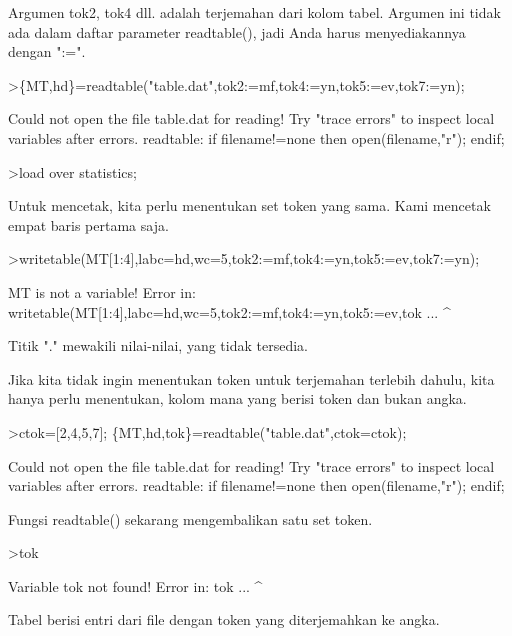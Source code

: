 \documentclass{article}
\begin{document}
\begin{eulernotebook}
\begin{eulercomment}
\begin{eulercomment}
\begin{eulercomment}
Argumen tok2, tok4 dll. adalah terjemahan dari kolom tabel. Argumen
ini tidak ada dalam daftar parameter readtable(), jadi Anda harus
menyediakannya dengan ":=".
\end{eulercomment}
\begin{eulerprompt}
>\{MT,hd\}=readtable("table.dat",tok2:=mf,tok4:=yn,tok5:=ev,tok7:=yn);
\end{eulerprompt}
\begin{euleroutput}
  Could not open the file
  table.dat
  for reading!
  Try "trace errors" to inspect local variables after errors.
  readtable:
      if filename!=none then open(filename,"r"); endif;
\end{euleroutput}
\begin{eulerprompt}
>load over statistics;
\end{eulerprompt}
\begin{eulercomment}
Untuk mencetak, kita perlu menentukan set token yang sama. Kami
mencetak empat baris pertama saja.
\end{eulercomment}
\begin{eulerprompt}
>writetable(MT[1:4],labc=hd,wc=5,tok2:=mf,tok4:=yn,tok5:=ev,tok7:=yn);
\end{eulerprompt}
\begin{euleroutput}
  MT is not a variable!
  Error in:
  writetable(MT[1:4],labc=hd,wc=5,tok2:=mf,tok4:=yn,tok5:=ev,tok ...
                    ^
\end{euleroutput}
\begin{eulercomment}
Titik "." mewakili nilai-nilai, yang tidak tersedia.

Jika kita tidak ingin menentukan token untuk terjemahan terlebih
dahulu, kita hanya perlu menentukan, kolom mana yang berisi token dan
bukan angka.
\end{eulercomment}
\begin{eulerprompt}
>ctok=[2,4,5,7]; \{MT,hd,tok\}=readtable("table.dat",ctok=ctok);
\end{eulerprompt}
\begin{euleroutput}
  Could not open the file
  table.dat
  for reading!
  Try "trace errors" to inspect local variables after errors.
  readtable:
      if filename!=none then open(filename,"r"); endif;
\end{euleroutput}
\begin{eulercomment}
Fungsi readtable() sekarang mengembalikan satu set token.
\end{eulercomment}
\begin{eulerprompt}
>tok
\end{eulerprompt}
\begin{euleroutput}
  Variable tok not found!
  Error in:
  tok ...
     ^
\end{euleroutput}
\begin{eulercomment}
Tabel berisi entri dari file dengan token yang diterjemahkan ke angka.


\end{eulercomment}
\end{eulercomment}
\end{eulercomment}
\end{eulernotebook}
\end{document}
